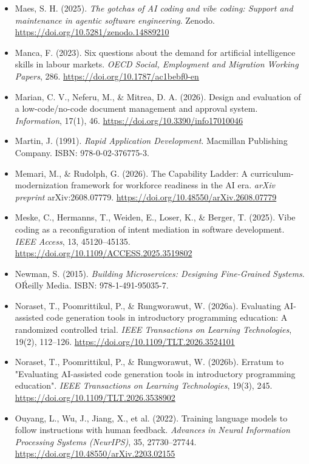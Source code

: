 \begin{itemize}[leftmargin=1.5em, label={}, itemsep=0.22ex, parsep=0pt]
    \item Maes, S. H. (2025). \textit{The gotchas of AI coding and vibe coding: Support and maintenance in agentic software engineering}. Zenodo. \url{https://doi.org/10.5281/zenodo.14889210}
    \item Manca, F. (2023). Six questions about the demand for artificial intelligence skills in labour markets. \textit{OECD Social, Employment and Migration Working Papers}, 286. \url{https://doi.org/10.1787/ac1bebf0-en}
    \item Marian, C. V., Neferu, M., \& Mitrea, D. A. (2026). Design and evaluation of a low-code/no-code document management and approval system. \textit{Information}, 17(1), 46. \url{https://doi.org/10.3390/info17010046}
    \item Martin, J. (1991). \textit{Rapid Application Development}. Macmillan Publishing Company. ISBN: 978-0-02-376775-3.
    \item Memari, M., \& Rudolph, G. (2026). The Capability Ladder: A curriculum-modernization framework for workforce readiness in the AI era. \textit{arXiv preprint} arXiv:2608.07779. \url{https://doi.org/10.48550/arXiv.2608.07779}
    \item Meske, C., Hermanns, T., Weiden, E., Loser, K., \& Berger, T. (2025). Vibe coding as a reconfiguration of intent mediation in software development. \textit{IEEE Access}, 13, 45120--45135. \url{https://doi.org/10.1109/ACCESS.2025.3519802}
    \item Newman, S. (2015). \textit{Building Microservices: Designing Fine-Grained Systems}. O\'Reilly Media. ISBN: 978-1-491-95035-7.
    \item Noraset, T., Poomrittikul, P., \& Rungworawut, W. (2026a). Evaluating AI-assisted code generation tools in introductory programming education: A randomized controlled trial. \textit{IEEE Transactions on Learning Technologies}, 19(2), 112--126. \url{https://doi.org/10.1109/TLT.2026.3524101}
    \item Noraset, T., Poomrittikul, P., \& Rungworawut, W. (2026b). Erratum to "Evaluating AI-assisted code generation tools in introductory programming education". \textit{IEEE Transactions on Learning Technologies}, 19(3), 245. \url{https://doi.org/10.1109/TLT.2026.3538902}
    \item Ouyang, L., Wu, J., Jiang, X., et al. (2022). Training language models to follow instructions with human feedback. \textit{Advances in Neural Information Processing Systems (NeurIPS)}, 35, 27730--27744. \url{https://doi.org/10.48550/arXiv.2203.02155}

\end{itemize}
